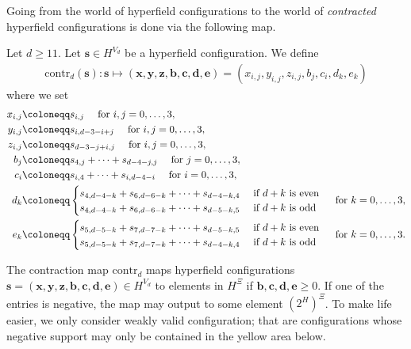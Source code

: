 Going from the world of hyperfield configurations to the world of \emph{contracted} hyperfield configurations is done via the following map.

\begin{definition}
    Let \( d \geq 11 \). Let \( \mathbf{s} \in H^{V_d} \) be a hyperfield configuration. We define 
    \begin{align*}
        \mathrm{contr}_d(\mathbf{s}): \mathbf{s} \mapsto (\mathbf{x}, \mathbf{y}, \mathbf{z}, \mathbf{b}, \mathbf{c}, \mathbf{d}, \mathbf{e}) = (x_{i,j}, y_{i,j}, z_{i,j}, b_j, c_i, d_k, e_k)
    \end{align*}
    where we set
    \begin{align*}
        x_{i,j} &\coloneqq s_{i,j} \quad \text{ for } i,j = 0, \dots, 3, \\
        y_{i,j} &\coloneqq s_{i, d-3-i+j} \quad \text{ for } i,j = 0, \dots, 3, \\
        z_{i,j} &\coloneqq s_{d-3-j+i,j} \quad \text{ for } i,j = 0, \dots, 3, \\
        b_j &\coloneqq s_{4,j} + \dots + s_{d-4-j,j} \quad \text{ for } j = 0, \dots, 3, \\
        c_i &\coloneqq s_{i,4} + \dots + s_{i,d-4-i} \quad \text{ for } i = 0, \dots, 3, \\
        d_k &\coloneqq \begin{cases}
            s_{4,d-4-k} + s_{6,d-6-k} + \dots + s_{d-4-k,4} & \text{ if \( d + k \) is even} \\
            s_{4,d-4-k} + s_{6,d-6-k} + \dots + s_{d-5-k,5} & \text{ if \( d + k \) is odd}
        \end{cases} \quad \text{ for } k = 0, \dots, 3, \\
        e_k &\coloneqq \begin{cases}
            s_{5,d-5-k} + s_{7,d-7-k} + \dots + s_{d-5-k,5} & \text{ if \( d + k \) is even} \\
            s_{5,d-5-k} + s_{7,d-7-k} + \dots + s_{d-4-k,4} & \text{ if \( d + k \) is odd}
        \end{cases} \quad \text{ for } k = 0, \dots, 3.
    \end{align*}
\end{definition}

The contraction map \( \mathrm{contr}_d \) maps hyperfield configurations \( \mathbf{s} = (\mathbf{x}, \mathbf{y}, \mathbf{z}, \mathbf{b}, \mathbf{c}, \mathbf{d}, \mathbf{e}) \in H^{{V_d}} \) to elements in \( H^{\Xi} \) if \( \mathbf{b}, \mathbf{c}, \mathbf{d}, \mathbf{e}  \geq 0\). If one of the entries is negative, the map may output to some element \( (2^H)^{\Xi} \). To make life easier, we only consider weakly valid configuration; that are configurations whose negative support may only be contained in the yellow area below.

